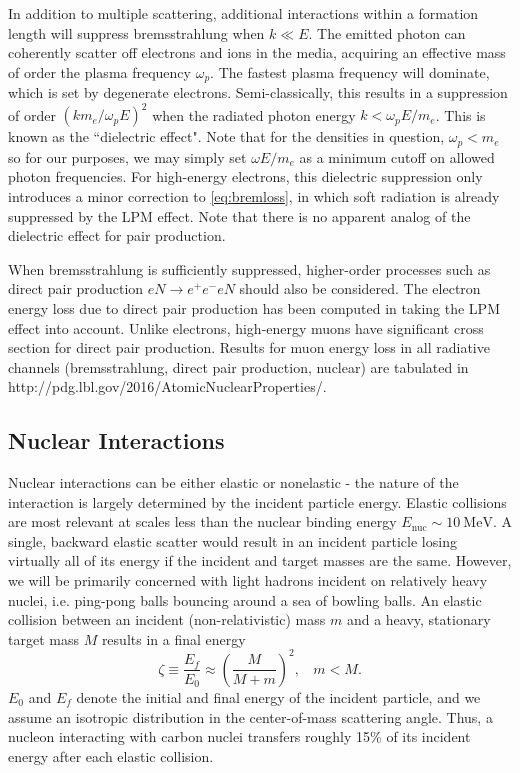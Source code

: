 \documentclass[twocolumn,showpacs,preprintnumbers,amsmath,amssymb,prd]{revtex4}
\def\r{\right)}
\def\l{\left(}
\begin{document}
\begin{appendices}
In addition to multiple scattering, additional interactions within a formation length will suppress bremsstrahlung when $k \ll E$. The emitted photon can coherently scatter off electrons and ions in the media, acquiring an effective mass of order the plasma frequency $\omega_p$. The fastest plasma frequency will dominate, which is set by degenerate electrons.
Semi-classically, this results in a suppression of order $(k m_e/\omega_p E)^2$ when the radiated photon energy $k < \omega_p E/m_e$. This is known as the ``dielectric effect". Note that for the densities in question, $\omega_p < m_e$ so for our purposes, we may simply set $\omega E/m_e$ as a minimum cutoff on allowed photon frequencies. For high-energy electrons, this dielectric suppression only introduces a minor correction to \eqref{eq:bremloss}, in which soft radiation is already suppressed by the LPM effect. Note that there is no apparent analog of the dielectric effect for pair production. 

When bremsstrahlung is sufficiently suppressed, higher-order processes such as direct pair production $e N \rightarrow e^+ e^- e N$ should also be considered. The electron energy loss due to direct pair production has been computed in \cite{Klein} taking the LPM effect into account. Unlike electrons, high-energy muons have significant cross section for direct pair production. Results for muon energy loss in all radiative channels (bremsstrahlung, direct pair production, nuclear) are tabulated in http://pdg.lbl.gov/2016/AtomicNuclearProperties/.  

\subsection*{Nuclear Interactions}

Nuclear interactions can be either elastic or nonelastic - the nature of the interaction is largely determined by the incident particle energy. Elastic collisions are most relevant at scales less than the nuclear binding energy $E_\text{nuc} \sim 10 ~\text{MeV}$. A single, backward elastic scatter would result in an incident particle losing virtually all of its energy if the incident and target masses are the same. However, we will be primarily concerned with light hadrons incident on relatively heavy nuclei, i.e. ping-pong balls bouncing around a sea of bowling balls.
An elastic collision between an incident (non-relativistic) mass $m$ and a heavy, stationary target mass $M$ results in a final energy 
\begin{equation}
\label{eq:elasticratio}
\zeta \equiv \frac{E_f}{E_0} \approx \l \frac{M}{M+m} \r^2, ~~~~ m < M.
\end{equation}
$E_0$ and $E_f$ denote the initial and final energy of the incident particle, and we assume an isotropic distribution in the center-of-mass scattering angle. Thus, a nucleon interacting with carbon nuclei transfers roughly 15\% of its incident energy after each elastic collision. 


\end{appendices}
\end{document}
